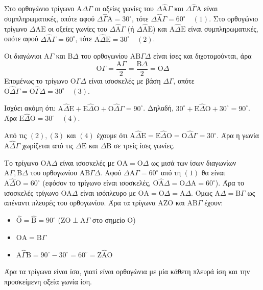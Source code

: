 \begin{alist}
    \item Στο ορθογώνιο τρίγωνο $\mathrm{A}\Delta\Gamma$ οι οξείες γωνίες του $\Delta\hat{\mathrm{A}}\Gamma$ και $\Delta\hat{\Gamma}\mathrm{A}$ είναι συμπληρωματικές, οπότε αφού $\Delta\hat{\Gamma}\mathrm{A} = 30^\circ$, τότε $\Delta\hat{\mathrm{A}}\Gamma = 60^\circ \quad (1)$. Στο ορθογώνιο τρίγωνο $\Delta\mathrm{A}\mathrm{E}$ οι οξείες γωνίες του $\Delta\hat{\mathrm{A}}\Gamma$ (ή $\Delta\hat{\mathrm{A}}\mathrm{E}$) και $\mathrm{A}\hat{\Delta}\mathrm{E}$ είναι συμπληρωματικές, οπότε αφού $\Delta\hat{\mathrm{A}}\Gamma = 60^\circ$, τότε $\mathrm{A}\hat{\Delta}\mathrm{E} = 30^\circ \quad (2)$.
    
    Οι διαγώνιοι $\mathrm{A}\Gamma$ και $\mathrm{B}\Delta$ του ορθογωνίου $\mathrm{A}\mathrm{B}\Gamma\Delta$ είναι ίσες και διχοτομούνται, άρα
    \[ \mathrm{O}\Gamma = \frac{\mathrm{A}\Gamma}{2} = \frac{\mathrm{B}\Delta}{2} = \mathrm{O}\Delta \]
    Επομένως το τρίγωνο $\mathrm{O}\Gamma\Delta$ είναι ισοσκελές με βάση $\Delta\Gamma$, οπότε $\mathrm{O}\hat{\Delta}\Gamma = \mathrm{O}\hat{\Gamma}\Delta = 30^\circ \quad (3)$.
    
    Ισχύει ακόμη ότι: $\mathrm{A}\hat{\Delta}\mathrm{E} + \mathrm{E}\hat{\Delta}\mathrm{O} + \mathrm{O}\hat{\Delta}\Gamma = 90^\circ$. Δηλαδή, $30^\circ + \mathrm{E}\hat{\Delta}\mathrm{O} + 30^\circ = 90^\circ$. Άρα $\mathrm{E}\hat{\Delta}\mathrm{O} = 30^\circ \quad (4)$.
    
    Από τις $(2), (3)$ και $(4)$ έχουμε ότι $\mathrm{A}\hat{\Delta}\mathrm{E} = \mathrm{E}\hat{\Delta}\mathrm{O} = \mathrm{O}\hat{\Delta}\Gamma = 30^\circ$. Άρα η γωνία $\mathrm{A}\hat{\Delta}\Gamma$ χωρίζεται από τις $\Delta\mathrm{E}$ και $\Delta\mathrm{B}$ σε τρείς ίσες γωνίες.
    
    \item Το τρίγωνο $\mathrm{O}\mathrm{A}\Delta$ είναι ισοσκελές με $\mathrm{O}\mathrm{A} = \mathrm{O}\Delta$ ως μισά των ίσων διαγωνίων $\mathrm{A}\Gamma, \mathrm{B}\Delta$ του ορθογωνίου $\mathrm{A}\mathrm{B}\Gamma\Delta$. Αφού $\Delta\hat{\mathrm{A}}\Gamma = 60^\circ$ από τη $(1)$ θα είναι $\mathrm{A}\hat{\Delta}\mathrm{O} = 60^\circ$ (εφόσον το τρίγωνο είναι ισοσκελές, $\mathrm{O}\hat{\mathrm{A}}\Delta = \mathrm{O}\hat{\Delta}\mathrm{A} = 60^\circ$). Άρα το ισοσκελές τρίγωνο $\mathrm{O}\mathrm{A}\Delta$ είναι ισόπλευρο με $\mathrm{O}\mathrm{A} = \mathrm{O}\Delta = \mathrm{A}\Delta$. Όμως $\mathrm{A}\Delta = \mathrm{B}\Gamma$ ως απέναντι πλευρές του ορθογωνίου. Άρα τα τρίγωνα $\mathrm{A}\mathrm{Z}\mathrm{O}$ και $\mathrm{A}\mathrm{B}\Gamma$ έχουν:
    \begin{itemize}
        \item $\hat{\mathrm{O}} = \hat{\mathrm{B}} = 90^\circ$ ($\mathrm{Z}\mathrm{O} \perp \mathrm{A}\Gamma$ στο σημείο $\mathrm{O}$)
        \item $\mathrm{O}\mathrm{A} = \mathrm{B}\Gamma$
        \item $\mathrm{A}\hat{\Gamma}\mathrm{B} = 90^\circ - 30^\circ = 60^\circ = \mathrm{Z}\hat{\mathrm{A}}\mathrm{O}$
    \end{itemize}
    Άρα τα τρίγωνα είναι ίσα, γιατί είναι ορθογώνια με μία κάθετη πλευρά ίση και την προσκείμενη οξεία γωνία ίση.
\end{alist}
